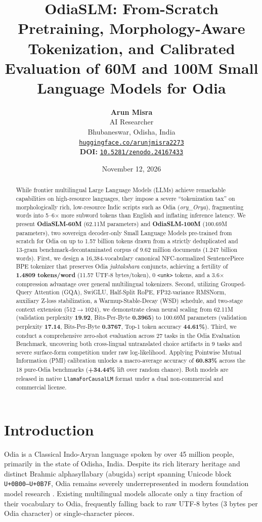 \documentclass[10pt,twocolumn,letterpaper]{article}
\title{\Large \textbf{OdiaSLM: From-Scratch Pretraining, Morphology-Aware Tokenization, and Calibrated Evaluation of 60M and 100M Small Language Models for Odia}}
\author{
  \textbf{Arun Misra} \\
  AI Researcher \\
  Bhubaneswar, Odisha, India \\
  \texttt{\href{https://huggingface.co/arunjmisra2273}{huggingface.co/arunjmisra2273}} \\[3pt]
  \small \textbf{DOI:} \texttt{\href{https://doi.org/10.5281/zenodo.24167433}{10.5281/zenodo.24167433}}
}
\date{November 12, 2026}
\begin{document}
\maketitle

\begin{abstract}
While frontier multilingual Large Language Models (LLMs) achieve remarkable capabilities on high-resource languages, they impose a severe ``tokenization tax'' on morphologically rich, low-resource Indic scripts such as Odia (\textit{ory\_Orya}), fragmenting words into 5--6$\times$ more subword tokens than English and inflating inference latency. We present \textbf{OdiaSLM-60M} (62.11M parameters) and \textbf{OdiaSLM-100M} (100.69M parameters), two sovereign decoder-only Small Language Models pre-trained from scratch for Odia on up to 1.57 billion tokens drawn from a strictly deduplicated and 13-gram benchmark-decontaminated corpus of 9.62 million documents (1.247 billion words). First, we design a 16,384-vocabulary canonical NFC-normalized SentencePiece BPE tokenizer that preserves Odia \textit{juktakshara} conjuncts, achieving a fertility of \textbf{1.4809 tokens/word} (11.57 UTF-8 bytes/token), 0 \texttt{<unk>} tokens, and a 3.6$\times$ compression advantage over general multilingual tokenizers. Second, utilizing Grouped-Query Attention (GQA), SwiGLU, Half-Split RoPE, FP32-variance RMSNorm, auxiliary Z-loss stabilization, a Warmup-Stable-Decay (WSD) schedule, and two-stage context extension ($512 \rightarrow 1024$), we demonstrate clean neural scaling from 62.11M (validation perplexity \textbf{19.92}, Bits-Per-Byte \textbf{0.3965}) to 100.69M parameters (validation perplexity \textbf{17.14}, Bits-Per-Byte \textbf{0.3767}, Top-1 token accuracy \textbf{44.61\%}). Third, we conduct a comprehensive zero-shot evaluation across 27 tasks in the Odia Evaluation Benchmark, uncovering both cross-lingual untranslated choice artifacts in 9 tasks and severe surface-form competition under raw log-likelihood. Applying Pointwise Mutual Information (PMI) calibration unlocks a macro-average accuracy of \textbf{60.83\%} across the 18 pure-Odia benchmarks (\textbf{+34.44\%} lift over random chance). Both models are released in native \texttt{LlamaForCausalLM} format under a dual non-commercial and commercial license.
\end{abstract}

\section{Introduction}
Odia is a Classical Indo-Aryan language spoken by over 45 million people, primarily in the state of Odisha, India. Despite its rich literary heritage and distinct Brahmic alphasyllabary (abugida) script spanning Unicode block \texttt{U+0B00--U+0B7F}, Odia remains severely underrepresented in modern foundation model research \cite{khan2024indicllmsuite}. Existing multilingual models allocate only a tiny fraction of their vocabulary to Odia, frequently falling back to raw UTF-8 bytes (3 bytes per Odia character) or single-character pieces.
\end{document}

